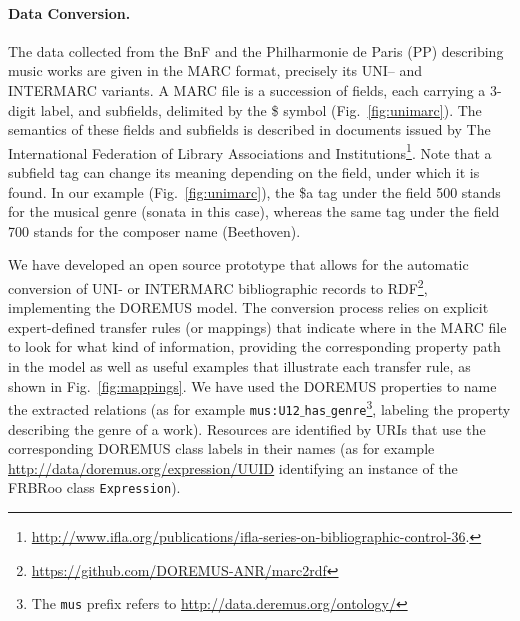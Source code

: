\documentclass[runningheads,a4paper]{llncs}
\begin{document}
\paragraph{{\bf Data Conversion.}}

The data collected from the BnF and the Philharmonie de Paris (PP) describing music works are given in the MARC format, precisely its UNI-- and INTERMARC variants. A MARC file is a succession of fields, each carrying a 3-digit label, and subfields, delimited by the \$ symbol (Fig.~\ref{fig:unimarc}). The semantics of these fields and subfields is described in documents issued by The International Federation of Library Associations and Institutions\footnote{\url{http://www.ifla.org/publications/ifla-series-on-bibliographic-control-36}.}. %
Note that a subfield tag can change its meaning depending on the field, under which it is found. In our example (Fig.~\ref{fig:unimarc}), the \$a tag under the field 500 stands for the musical genre (sonata in this case), whereas the same tag under the field 700 stands for the composer name (Beethoven).

We have developed an open source prototype that allows for the automatic conversion of UNI- or INTERMARC bibliographic records to RDF\footnote{\url{https://github.com/DOREMUS-ANR/marc2rdf}}, implementing the DOREMUS model. The conversion process relies on explicit expert-defined transfer rules (or mappings) that indicate where in the MARC file to look for what kind of information, providing the corresponding property path in the model as well as useful examples that illustrate each transfer rule, as shown in Fig.~\ref{fig:mappings}. %
We have used the DOREMUS properties to name the extracted relations (as for example \texttt{mus:U12$\_$has$\_$genre}\footnote{The \texttt{mus} prefix refers to \url{http://data.deremus.org/ontology/}}, labeling the property describing the genre of a work).  Resources are identified by URIs that use the corresponding DOREMUS class labels in their names (as for example \url{http://data/doremus.org/expression/UUID} identifying an instance of the FRBRoo class \texttt{Expression}).
\end{document}
